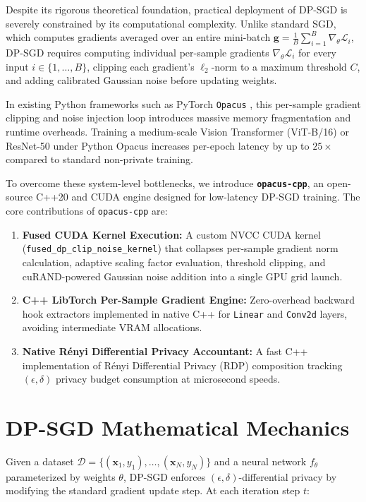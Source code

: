 \documentclass[11pt,onecolumn,a4paper]{article}
\begin{document}
Despite its rigorous theoretical foundation, practical deployment of DP-SGD is severely constrained by its computational complexity. Unlike standard SGD, which computes gradients averaged over an entire mini-batch $\mathbf{g} = \frac{1}{B}\sum_{i=1}^B \nabla_\theta \mathcal{L}_i$, DP-SGD requires computing individual per-sample gradients $\nabla_\theta \mathcal{L}_i$ for every input $i \in \{1, \dots, B\}$, clipping each gradient's $\ell_2$-norm to a maximum threshold $C$, and adding calibrated Gaussian noise before updating weights.

In existing Python frameworks such as PyTorch \texttt{Opacus} \cite{yousefpour2021opacus}, this per-sample gradient clipping and noise injection loop introduces massive memory fragmentation and runtime overheads. Training a medium-scale Vision Transformer (ViT-B/16) or ResNet-50 under Python Opacus increases per-epoch latency by up to $25\times$ compared to standard non-private training.

To overcome these system-level bottlenecks, we introduce \textbf{\texttt{opacus-cpp}}, an open-source C++20 and CUDA engine designed for low-latency DP-SGD training. The core contributions of \texttt{opacus-cpp} are:
\begin{enumerate}
    \item \textbf{Fused CUDA Kernel Execution:} A custom NVCC CUDA kernel (\texttt{fused\_dp\_clip\_noise\_kernel}) that collapses per-sample gradient norm calculation, adaptive scaling factor evaluation, threshold clipping, and cuRAND-powered Gaussian noise addition into a single GPU grid launch.
    \item \textbf{C++ LibTorch Per-Sample Gradient Engine:} Zero-overhead backward hook extractors implemented in native C++ for \texttt{Linear} and \texttt{Conv2d} layers, avoiding intermediate VRAM allocations.
    \item \textbf{Native Rényi Differential Privacy Accountant:} A fast C++ implementation of Rényi Differential Privacy (RDP) \cite{mironov2017renyi} composition tracking $(\epsilon, \delta)$ privacy budget consumption at microsecond speeds.
\end{enumerate}

\section{DP-SGD Mathematical Mechanics}

Given a dataset $\mathcal{D} = \{(\mathbf{x}_1, y_1), \dots, (\mathbf{x}_N, y_N)\}$ and a neural network $f_\theta$ parameterized by weights $\theta$, DP-SGD enforces $(\epsilon, \delta)$-differential privacy by modifying the standard gradient update step. At each iteration step $t$:
\end{document}
